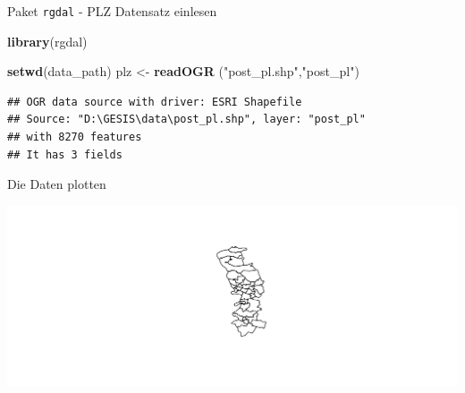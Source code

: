 \documentclass[ignorenonframetext,]{beamer}
\newenvironment{Shaded}{\begin{snugshade}}{\end{snugshade}}
\newcommand{\DecValTok}[1]{\textcolor[rgb]{0.00,0.00,0.81}{#1}}
\newcommand{\KeywordTok}[1]{\textcolor[rgb]{0.13,0.29,0.53}{\textbf{#1}}}
\newcommand{\NormalTok}[1]{#1}
\newcommand{\OperatorTok}[1]{\textcolor[rgb]{0.81,0.36,0.00}{\textbf{#1}}}
\newcommand{\StringTok}[1]{\textcolor[rgb]{0.31,0.60,0.02}{#1}}
\begin{document}
\begin{frame}[fragile]{Paket \texttt{rgdal} - PLZ Datensatz einlesen}
\protect\hypertarget{paket-rgdal---plz-datensatz-einlesen}{}

\begin{Shaded}
\begin{Highlighting}[]
\KeywordTok{library}\NormalTok{(rgdal)}
\end{Highlighting}
\end{Shaded}

\begin{Shaded}
\begin{Highlighting}[]
\KeywordTok{setwd}\NormalTok{(data_path)}
\NormalTok{plz <-}\StringTok{ }\KeywordTok{readOGR}\NormalTok{ (}\StringTok{"post_pl.shp"}\NormalTok{,}\StringTok{"post_pl"}\NormalTok{)}
\end{Highlighting}
\end{Shaded}

\begin{verbatim}
## OGR data source with driver: ESRI Shapefile 
## Source: "D:\GESIS\data\post_pl.shp", layer: "post_pl"
## with 8270 features
## It has 3 fields
\end{verbatim}

\end{frame}

\begin{frame}[fragile]{Die Daten plotten}
\protect\hypertarget{die-daten-plotten}{}

\begin{Shaded}
\end{Shaded}

\includegraphics{A6_Shapefiles_files/figure-beamer/unnamed-chunk-16-1.pdf}

\end{frame}
\end{document}
